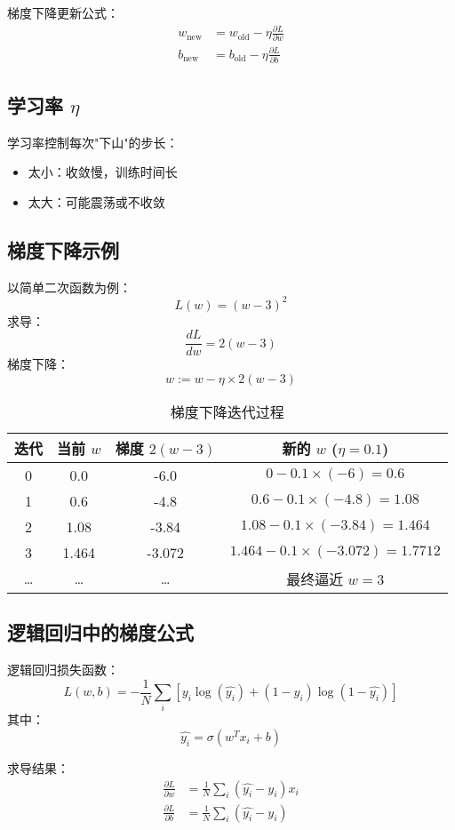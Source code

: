 \documentclass[UTF8]{ctexart}
\begin{document}
	梯度下降更新公式：
	\begin{align}
		w_{\text{new}} &= w_{\text{old}} - \eta \frac{\partial L}{\partial w} \\
		b_{\text{new}} &= b_{\text{old}} - \eta \frac{\partial L}{\partial b}
	\end{align}
	
	\subsection{学习率 $\eta$}
	学习率控制每次"下山"的步长：
	\begin{itemize}
		\item 太小：收敛慢，训练时间长
		\item 太大：可能震荡或不收敛
	\end{itemize}
	
	\subsection{梯度下降示例}
	以简单二次函数为例：
	\[
	L(w) = (w - 3)^2
	\]
	求导：
	\[
	\frac{dL}{dw} = 2(w - 3)
	\]
	梯度下降：
	\[
	w := w - \eta \times 2(w - 3)
	\]
	
	\begin{table}[H]
		\centering
		\begin{tabular}{cccc}
			\toprule
			迭代 & 当前 $w$ & 梯度 $2(w-3)$ & 新的 $w$ ($\eta=0.1$) \\
			\midrule
			0 & 0.0 & -6.0 & $0 - 0.1\times(-6) = 0.6$ \\
			1 & 0.6 & -4.8 & $0.6 - 0.1\times(-4.8)=1.08$ \\
			2 & 1.08 & -3.84 & $1.08 - 0.1\times(-3.84)=1.464$ \\
			3 & 1.464 & -3.072 & $1.464 - 0.1\times(-3.072)=1.7712$ \\
			\ldots & \ldots & \ldots & 最终逼近 $w=3$ \\
			\bottomrule
		\end{tabular}
		\caption{梯度下降迭代过程}
	\end{table}
	
	\subsection{逻辑回归中的梯度公式}
	逻辑回归损失函数：
	\[
	L(w, b) = -\frac{1}{N} \sum_i \left[ y_i \log(\hat{y_i}) + (1-y_i)\log(1-\hat{y_i}) \right]
	\]
	其中：
	\[
	\hat{y_i} = \sigma(w^T x_i + b)
	\]
	
	求导结果：
	\begin{align}
		\frac{\partial L}{\partial w} &= \frac{1}{N}\sum_i (\hat{y_i} - y_i)x_i \\
		\frac{\partial L}{\partial b} &= \frac{1}{N}\sum_i (\hat{y_i} - y_i)
	\end{align}
	
\end{document}
